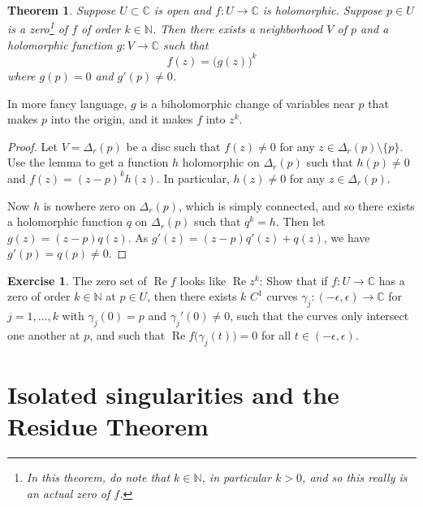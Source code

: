 \documentclass[12pt,openany]{book}
\renewcommand{\Re}{\operatorname{Re}}
\newcommand{\C}{{\mathbb{C}}}
\newcommand{\N}{{\mathbb{N}}}
\theoremstyle{plain}
\newtheorem{thm}{Theorem}[section]
\theoremstyle{remark}
\theoremstyle{definition}
\newenvironment{exbox}{%
    \def\FrameCommand{\vrule width 1pt \relax\hspace {10pt}}%
    \MakeFramed {\advance \hsize -\width \FrameRestore }%
}{%
    \endMakeFramed
}
\theoremstyle{exercise}
\newtheorem{exercise}{Exercise}[section]
\theoremstyle{example}
\begin{document}
\begin{thm}
Suppose $U \subset \C$ is open and $f \colon U \to \C$ is holomorphic.
Suppose $p \in U$ is a zero\footnote{In this theorem, do note
that $k \in \N$, in particular $k > 0$, and so this really is an actual zero
of $f$.} of $f$ of order $k \in \N$.  Then there exists a neighborhood $V$
of $p$ and a holomorphic function $g \colon V \to \C$ such that
\begin{equation*}
f(z) = {\bigl( g(z) \bigr)}^k
\end{equation*}
where $g(p) = 0$ and $g'(p) \not= 0$.
\end{thm}

In more fancy language, $g$ is a biholomorphic change of variables near
$p$ that makes $p$ into the origin, and it makes $f$ into $z^k$.

\begin{proof}
Let $V = \Delta_r(p)$ be a disc such that $f(z) \not= 0$ for any $z \in
\Delta_r(p) \setminus \{ p \}$.  Use the lemma to get a function $h$ holomorphic
on $\Delta_r(p)$ such that $h(p) \not= 0$ and $f(z) = {(z-p)}^k h(z)$.  In particular,
$h(z) \not= 0$ for any $z \in \Delta_r(p)$.

Now $h$ is nowhere zero on $\Delta_r(p)$, which is simply connected,
and so there exists a holomorphic function $q$ on $\Delta_r(p)$ such that
$q^k = h$.  Then let $g(z) = (z-p)q(z)$.  As
$g'(z) = (z-p) q'(z) + q(z)$, we have $g'(p) = q(p) \not= 0$.
\end{proof}

\begin{exbox}
\begin{exercise}
The zero set of $\Re f$ looks like $\Re z^k$:
Show that if $f \colon U \to \C$ has a zero of order $k \in \N$ at $p \in
U$, then there exists $k$  $C^1$ curves
$\gamma_j \colon (-\epsilon, \epsilon) \to \C$ for
$j=1,\ldots,k$ with $\gamma_j(0) = p$
and $\gamma_j'(0) \not= 0$, such that the curves only intersect
one another
at $p$, and such that $\Re f\bigl( \gamma_j(t) \bigr) = 0$ for
all $t \in (-\epsilon,\epsilon)$.
\end{exercise}
\end{exbox}


\section{Isolated singularities and the Residue Theorem}
\end{document}
